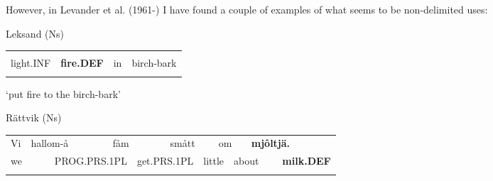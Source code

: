 However, in Levander et al. (1961-) I have found a couple of examples of what seems to be non-delimited uses:

\begin{listWWNumileveli}
\item 

\begin{styleExample}
\label{bkm:Ref154222785}Leksand (Ns)

\end{styleExample}

\end{listWWNumileveli}

\begin{tabular}{llll}
\lsptoprule
\multicolumn{4}{l}{tännd

}\\
light.INF & {\bfseries fire.DEF} & in & birch-bark\\
\lspbottomrule
\end{tabular}

\begin{styleTranslation}
‘put fire to the birch-bark’

\end{styleTranslation}

\begin{listWWNumileveli}
\item 

\begin{styleExample}
Rättvik (Ns)

\end{styleExample}

\end{listWWNumileveli}

\begin{tabular}{llllllllllll}
\lsptoprule
Vi & \multicolumn{2}{l}{hallom-å

} & \multicolumn{2}{l}{fåm

} & \multicolumn{2}{l}{smått

} & \multicolumn{2}{l}{om

} & \multicolumn{2}{l}{{\bfseries mjôltjä.}

} & \\
\multicolumn{2}{l}{we

} & \multicolumn{2}{l}{PROG.PRS.1PL

} & \multicolumn{2}{l}{get.PRS.1PL

} & \multicolumn{2}{l}{little

} & \multicolumn{2}{l}{about

} & \multicolumn{2}{l}{{\bfseries milk.DEF}

}\\
\lspbottomrule
\end{tabular}

